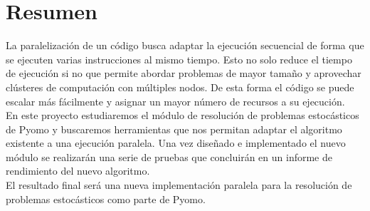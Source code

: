 \pagestyle{plain}
\chapter*{Resumen}

La paralelización de un código busca adaptar la ejecución secuencial de forma que se ejecuten varias instrucciones al mismo tiempo. Esto no solo reduce el tiempo de ejecución si no que permite abordar problemas de mayor tamaño y aprovechar clústeres de computación con múltiples nodos. De esta forma el código se puede escalar más fácilmente y asignar un mayor número de recursos a su ejecución.\\

En este proyecto estudiaremos el módulo de resolución de problemas estocásticos de Pyomo y buscaremos herramientas que nos permitan adaptar el algoritmo existente a una ejecución paralela. Una vez diseñado e implementado el nuevo módulo se realizarán una serie de pruebas que concluirán en un informe de rendimiento del nuevo algoritmo.\\

El resultado final será una nueva implementación paralela para la resolución de problemas estocásticos como parte de Pyomo.